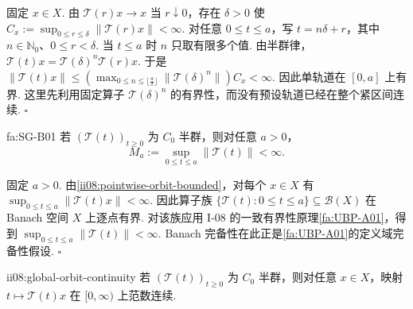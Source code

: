\begin{FAProof}
固定 \(\displaystyle x\in X\). 由 \(\displaystyle\mathcal T(r)x\to x\) 当 \(\displaystyle r\downarrow0\)，存在 \(\displaystyle\delta>0\) 使
\(\displaystyle C_x:=\sup_{0\leqslant r\leqslant\delta}\|\mathcal T(r)x\|<\infty.\)
对任意 \(\displaystyle0\leqslant t\leqslant a\)，写 \(\displaystyle t=n\delta+r\)，其中 \(\displaystyle n\in\mathbb N_0\)、\(\displaystyle0\leqslant r<\delta\). 当 \(\displaystyle t\leqslant a\) 时 \(\displaystyle n\) 只取有限多个值. 由半群律，
\(\displaystyle \mathcal T(t)x = \mathcal T(\delta)^n\mathcal T(r)x.\)
于是
\(\displaystyle \|\mathcal T(t)x\| \leqslant \left(\max_{0\leqslant n\leqslant\lfloor \frac{a}{\delta}\rfloor}\|\mathcal T(\delta)^n\|\right)C_x<\infty.\)
因此单轨道在 \(\displaystyle[0,a]\) 上有界. 这里先利用固定算子 \(\displaystyle\mathcal T(\delta)^n\) 的有界性，而没有预设轨道已经在整个紧区间连续.
\hfill\(\square\)
\end{FAProof}

\begin{FATheorem}[B][半群的局部一致有界性]{fa:SG-B01}
若 \(\displaystyle(\mathcal T(t))_{t\geqslant0}\) 为 \(\displaystyle C_0\) 半群，则对任意 \(\displaystyle a>0\)，
\[
M_a
:=
\sup_{0\leqslant t\leqslant a}\|\mathcal T(t)\|
<\infty.
\]
\end{FATheorem}

\begin{FAProof}
固定 \(\displaystyle a>0\). 由\autoref{ii08:pointwise-orbit-bounded}，对每个 \(\displaystyle x\in X\) 有
\(\displaystyle \sup_{0\leqslant t\leqslant a}\|\mathcal T(t)x\|<\infty.\)
因此算子族 \(\displaystyle\{\mathcal T(t):0\leqslant t\leqslant a\}\subseteq\mathcal B(X)\) 在 Banach 空间 \(\displaystyle X\) 上逐点有界. 对该族应用 I-08 的一致有界性原理\autoref{fa:UBP-A01}，得到
\(\displaystyle \sup_{0\leqslant t\leqslant a}\|\mathcal T(t)\|<\infty.\)
Banach 完备性在此正是\autoref{fa:UBP-A01}的定义域完备性假设.
\hfill\(\square\)
\end{FAProof}

\begin{FAProposition}[B][每条轨道在全部时间连续]{ii08:global-orbit-continuity}
若 \(\displaystyle(\mathcal T(t))_{t\geqslant0}\) 为 \(\displaystyle C_0\) 半群，则对任意 \(\displaystyle x\in X\)，映射 \(\displaystyle t\mapsto\mathcal T(t)x\) 在 \(\displaystyle[0,\infty)\) 上范数连续.
\end{FAProposition}

